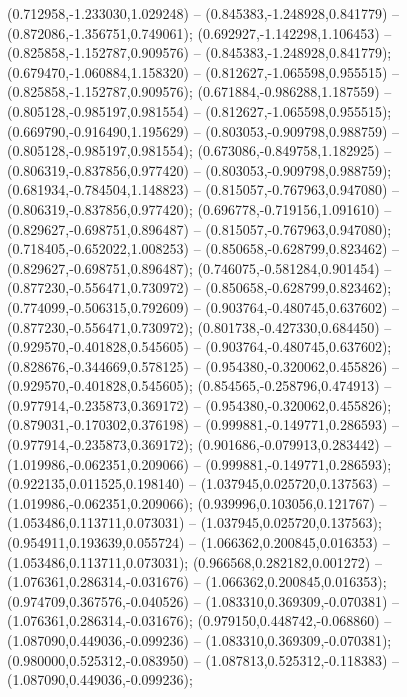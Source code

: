 (0.712958,-1.233030,1.029248) -- (0.845383,-1.248928,0.841779) -- (0.872086,-1.356751,0.749061);
 (0.692927,-1.142298,1.106453) -- (0.825858,-1.152787,0.909576) -- (0.845383,-1.248928,0.841779);
 (0.679470,-1.060884,1.158320) -- (0.812627,-1.065598,0.955515) -- (0.825858,-1.152787,0.909576);
 (0.671884,-0.986288,1.187559) -- (0.805128,-0.985197,0.981554) -- (0.812627,-1.065598,0.955515);
 (0.669790,-0.916490,1.195629) -- (0.803053,-0.909798,0.988759) -- (0.805128,-0.985197,0.981554);
 (0.673086,-0.849758,1.182925) -- (0.806319,-0.837856,0.977420) -- (0.803053,-0.909798,0.988759);
 (0.681934,-0.784504,1.148823) -- (0.815057,-0.767963,0.947080) -- (0.806319,-0.837856,0.977420);
 (0.696778,-0.719156,1.091610) -- (0.829627,-0.698751,0.896487) -- (0.815057,-0.767963,0.947080);
 (0.718405,-0.652022,1.008253) -- (0.850658,-0.628799,0.823462) -- (0.829627,-0.698751,0.896487);
 (0.746075,-0.581284,0.901454) -- (0.877230,-0.556471,0.730972) -- (0.850658,-0.628799,0.823462);
 (0.774099,-0.506315,0.792609) -- (0.903764,-0.480745,0.637602) -- (0.877230,-0.556471,0.730972);
 (0.801738,-0.427330,0.684450) -- (0.929570,-0.401828,0.545605) -- (0.903764,-0.480745,0.637602);
 (0.828676,-0.344669,0.578125) -- (0.954380,-0.320062,0.455826) -- (0.929570,-0.401828,0.545605);
 (0.854565,-0.258796,0.474913) -- (0.977914,-0.235873,0.369172) -- (0.954380,-0.320062,0.455826);
 (0.879031,-0.170302,0.376198) -- (0.999881,-0.149771,0.286593) -- (0.977914,-0.235873,0.369172);
 (0.901686,-0.079913,0.283442) -- (1.019986,-0.062351,0.209066) -- (0.999881,-0.149771,0.286593);
 (0.922135,0.011525,0.198140) -- (1.037945,0.025720,0.137563) -- (1.019986,-0.062351,0.209066);
 (0.939996,0.103056,0.121767) -- (1.053486,0.113711,0.073031) -- (1.037945,0.025720,0.137563);
 (0.954911,0.193639,0.055724) -- (1.066362,0.200845,0.016353) -- (1.053486,0.113711,0.073031);
 (0.966568,0.282182,0.001272) -- (1.076361,0.286314,-0.031676) -- (1.066362,0.200845,0.016353);
 (0.974709,0.367576,-0.040526) -- (1.083310,0.369309,-0.070381) -- (1.076361,0.286314,-0.031676);
 (0.979150,0.448742,-0.068860) -- (1.087090,0.449036,-0.099236) -- (1.083310,0.369309,-0.070381);
 (0.980000,0.525312,-0.083950) -- (1.087813,0.525312,-0.118383) -- (1.087090,0.449036,-0.099236);
